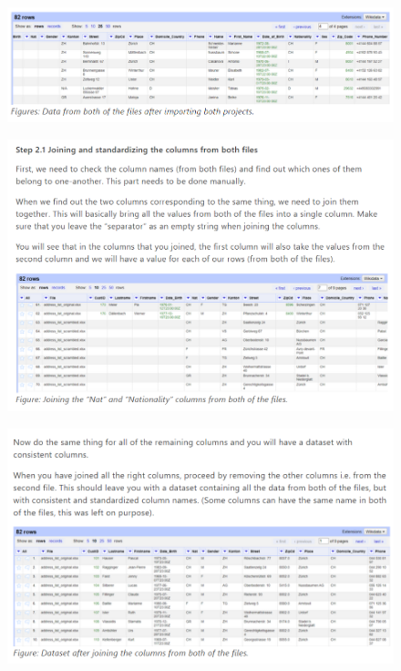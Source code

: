 \begin{figure}[H]
    \includegraphics[width=\linewidth]{./Figures/Appendices/worksheet/29.png}
\end{figure}
\begin{figure}[H]
    \includegraphics[width=\linewidth]{./Figures/Appendices/worksheet/30.png}
\end{figure}
\begin{figure}[H]
    \includegraphics[width=\linewidth]{./Figures/Appendices/worksheet/31.png}
\end{figure}
